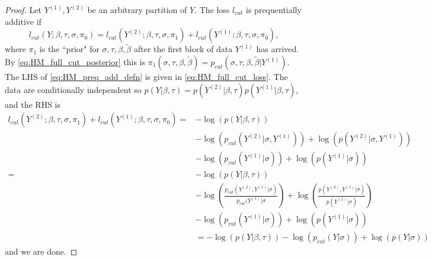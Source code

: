 \begin{proof} Let $Y^{(1)},Y^{(2)}$ be an arbitrary partition of $Y$. The loss $l_{cut}$ is prequentially additive if
  \begin{equation}\label{eq:HM_preq_add_defn}
    l_{cut}(Y; \beta,\tau, \sigma, \pi_0)=l_{cut}(Y^{(2)}; \beta,\tau, \sigma, \pi_1)+l_{cut}(Y^{(1)}; \beta,\tau, \sigma, \pi_0),
  \end{equation}
  where $\pi_1$ is the ``prior" for $\sigma,\tau,\beta,\tilde\beta$ after the first block of data $Y^{(1)}$ has arrived. By \cref{eq:HM_full_cut_posterior} this is $\pi_1(\sigma,\tau,\beta,\tilde\beta)=p_{cut}(\sigma,\tau,\beta,\tilde\beta|Y^{(1)})$.
  The LHS of \cref{eq:HM_preq_add_defn} is given in \cref{eq:HM_full_cut_loss}.
  The data are conditionally independent so $p(Y|\beta,\tau)=p(Y^{(2)}|\beta,\tau)p(Y^{(1)}|\beta,\tau)$, and the RHS is
  \begin{align*}
    l_{cut}(Y^{(2)}; \beta,\tau, \sigma, \pi_1)+l_{cut}(Y^{(1)}; \beta,\tau, \sigma, \pi_0)= &
    -\log(p(Y|\beta,\tau))                                                                                                                                                                                                                           \\
                                                                                             & -\log(p_{cut}(Y^{(2)}|\sigma,Y^{(1)}))+\log(p(Y^{(2)}|\sigma,Y^{(1)}))                                                                                \\
                                                                                             & -\log(p_{cut}(Y^{(1)}|\sigma))+\log(p(Y^{(1)}|\sigma))                                                                                                \\
    =                                                                                        & -\log(p(Y|\beta,\tau))                                                                                                                                \\
                                                                                             & -\log\left(\frac{p_{cut}(Y^{(2)},Y^{(1)}|\sigma)}{p_{cut}(Y^{(1)}|\sigma}\right)+\log\left(\frac{p(Y^{(2)},Y^{(1)}|\sigma)}{p(Y^{(1)}|\sigma)}\right) \\
                                                                                             & -\log(p_{cut}(Y^{(1)}|\sigma))+\log(p(Y^{(1)}|\sigma))                                                                                                \\
                                                                                             & =-\log(p(Y|\beta,\tau))-\log(p_{cut}(Y|\sigma))+\log(p(Y|\sigma))
  \end{align*}
  and we are done.
\end{proof}

